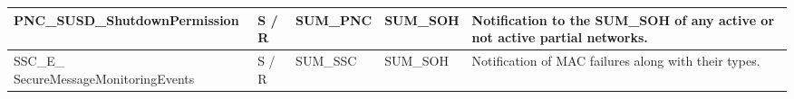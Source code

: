 \begin{longtable}{|l|l|l|l|l|}
\begin{minipage}{0.39\linewidth}\raggedright\vspace{.75ex}PNC\_SUSD\_ShutdownPermission\vspace{.75ex}\end{minipage} & \begin{minipage}{0.07\linewidth}\raggedright\vspace{.75ex}S / R\vspace{.75ex}\end{minipage} & \begin{minipage}{0.11\linewidth}\raggedright\vspace{.75ex}SUM\_PNC\vspace{.75ex}\end{minipage} & \begin{minipage}{0.11\linewidth}\raggedright\vspace{.75ex}SUM\_SOH\vspace{.75ex}\end{minipage} & \begin{minipage}{0.16\linewidth}\raggedright\vspace{.75ex}Notification to the SUM\_SOH of any active or not active partial networks.\vspace{.75ex}\end{minipage}\\\hline
\begin{minipage}{0.39\linewidth}\raggedright\vspace{.75ex}SSC\_E\_ SecureMessageMonitoringEvents\vspace{.75ex}\end{minipage} & \begin{minipage}{0.07\linewidth}\raggedright\vspace{.75ex}S / R\vspace{.75ex}\end{minipage} & \begin{minipage}{0.11\linewidth}\raggedright\vspace{.75ex}SUM\_SSC\vspace{.75ex}\end{minipage} & \begin{minipage}{0.11\linewidth}\raggedright\vspace{.75ex}SUM\_SOH\vspace{.75ex}\end{minipage} & \begin{minipage}{0.16\linewidth}\raggedright\vspace{.75ex}Notification of MAC failures along with their types.\vspace{.75ex}\end{minipage}\\\hline

\end{longtable}
